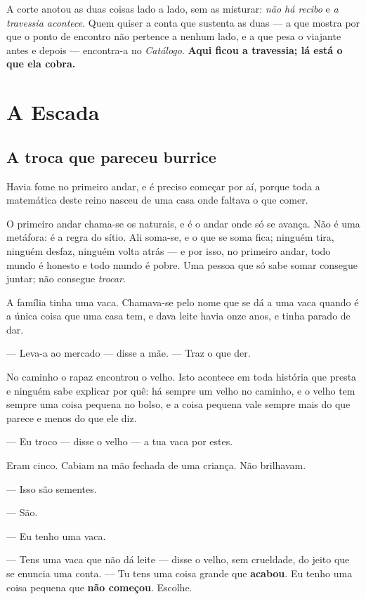 \documentclass[livro.tex]{subfiles}
\begin{document}
\medskip
\noindent A corte anotou as duas coisas lado a lado, sem as misturar: \emph{não há recibo}
e \emph{a travessia acontece}. Quem quiser a conta que sustenta as duas --- a que mostra
por que o ponto de encontro não pertence a nenhum lado, e a que pesa o viajante antes e
depois --- encontra-a no \emph{Catálogo}. \textbf{Aqui ficou a travessia; lá está o
que ela cobra.}

\part{A Escada}

\chapter{A troca que pareceu burrice}

Havia fome no primeiro andar, e é preciso começar por aí, porque toda a matemática deste
reino nasceu de uma casa onde faltava o que comer.

O primeiro andar chama-se os naturais, e é o andar onde só se avança. Não é uma metáfora: é a
regra do sítio. Ali soma-se, e o que se soma fica; ninguém tira, ninguém desfaz, ninguém
volta atrás --- e por isso, no primeiro andar, todo mundo é honesto e todo mundo é pobre.
Uma pessoa que só sabe somar consegue juntar; não consegue \emph{trocar}.

A família tinha uma vaca. Chamava-se pelo nome que se dá a uma vaca quando é a única
coisa que uma casa tem, e dava leite havia onze anos, e tinha parado de dar.

--- Leva-a ao mercado --- disse a mãe. --- Traz o que der.

\medskip

No caminho o rapaz encontrou o velho. Isto acontece em toda história que presta e ninguém
sabe explicar por quê: há sempre um velho no caminho, e o velho tem sempre uma coisa
pequena no bolso, e a coisa pequena vale sempre mais do que parece e menos do que ele
diz.

--- Eu troco --- disse o velho --- a tua vaca por estes.

Eram cinco. Cabiam na mão fechada de uma criança. Não brilhavam.

--- Isso são sementes.

--- São.

--- Eu tenho uma vaca.

--- Tens uma vaca que não dá leite --- disse o velho, sem crueldade, do jeito que se
enuncia uma conta. --- Tu tens uma coisa grande que \textbf{acabou}. Eu tenho uma coisa
pequena que \textbf{não começou}. Escolhe.
\end{document}
